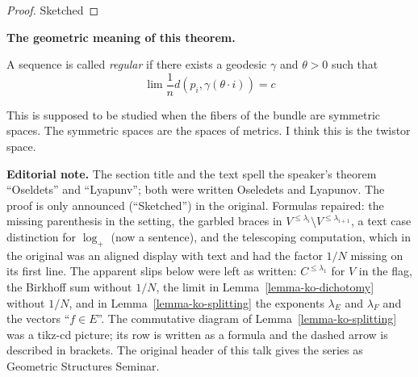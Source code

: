\begin{proof}
Sketched
\end{proof}

\medskip\noindent
{\bf The geometric meaning of this
theorem.}

\begin{definition}
\label{definition-ko-regular}
A sequence is called \textit{regular} if
there exists a geodesic $\gamma$ and
$\theta>0$ such that
$$
\lim \frac{1}{n}d(p_i,
\gamma(\theta\cdot i))=c
$$
\end{definition}

\begin{remark}
\label{remark-ko-symmetric}
This is supposed to be studied when the
fibers of the bundle are symmetric spaces.
The symmetric spaces are the spaces of
metrics. I think this is the twistor space.
\end{remark}

\medskip\noindent
{\bf Editorial note.}
The section title and the text spell the
speaker's theorem ``Oseldets'' and
``Lyapunv''; both were written Oseledets and
Lyapunov. The proof is only announced
(``Sketched'') in the original. Formulas
repaired: the missing parenthesis in the
setting, the garbled braces in
$V^{\leq \lambda_i}\setminus
V^{\leq \lambda_{i+1}}$, a text case
distinction for $\operatorname{log}_+$ (now
a sentence), and the telescoping computation,
which in the original was an aligned display
with text and had the factor $1/N$ missing
on its first line. The apparent slips
below were left as written: $C^{\leq
\lambda_1}$ for $V$ in the flag, the Birkhoff
sum without $1/N$, the limit in
Lemma~\ref{lemma-ko-dichotomy} without $1/N$,
and in Lemma~\ref{lemma-ko-splitting} the
exponents $\lambda_E$ and $\lambda_F$ and the
vectors ``$f \in E$''. The commutative
diagram of Lemma~\ref{lemma-ko-splitting}
was a tikz-cd picture; its row is
written as a formula and the dashed arrow
is described in brackets. The original
header of this talk gives the series as
Geometric Structures Seminar.






